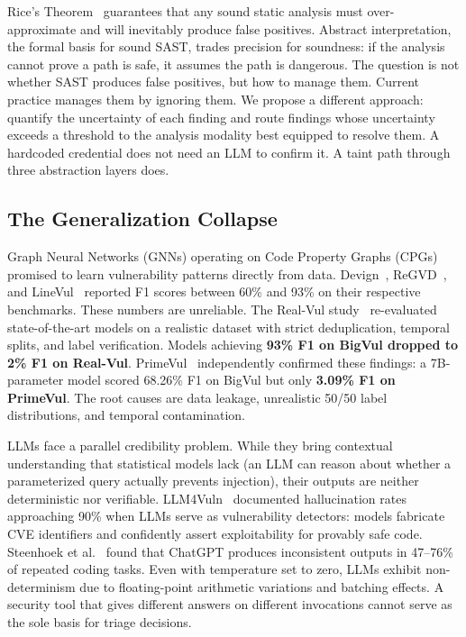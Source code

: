Rice's Theorem~\cite{rice1953} guarantees that any sound static analysis must over-approximate and will inevitably produce false positives. Abstract interpretation, the formal basis for sound SAST, trades precision for soundness: if the analysis cannot prove a path is safe, it assumes the path is dangerous. The question is not whether SAST produces false positives, but how to manage them. Current practice manages them by ignoring them. We propose a different approach: quantify the uncertainty of each finding and route findings whose uncertainty exceeds a threshold to the analysis modality best equipped to resolve them. A hardcoded credential does not need an LLM to confirm it. A taint path through three abstraction layers does.


\subsection{The Generalization Collapse}

Graph Neural Networks (GNNs) operating on Code Property Graphs (CPGs)~\cite{cpg2014} promised to learn vulnerability patterns directly from data. Devign~\cite{devign2019}, ReGVD~\cite{regvd2022}, and LineVul~\cite{linevul2022} reported F1 scores between 60\% and 93\% on their respective benchmarks. These numbers are unreliable. The Real-Vul study~\cite{realvul2024} re-evaluated state-of-the-art models on a realistic dataset with strict deduplication, temporal splits, and label verification. Models achieving \textbf{93\% F1 on BigVul dropped to 2\% F1 on Real-Vul}. PrimeVul~\cite{primevul2024} independently confirmed these findings: a 7B-parameter model scored 68.26\% F1 on BigVul but only \textbf{3.09\% F1 on PrimeVul}. The root causes are data leakage, unrealistic 50/50 label distributions, and temporal contamination.

LLMs face a parallel credibility problem. While they bring contextual understanding that statistical models lack (an LLM can reason about whether a parameterized query actually prevents injection), their outputs are neither deterministic nor verifiable. LLM4Vuln~\cite{llm4vuln2024} documented hallucination rates approaching 90\% when LLMs serve as vulnerability detectors: models fabricate CVE identifiers and confidently assert exploitability for provably safe code. Steenhoek et al.~\cite{steenhoek2024} found that ChatGPT produces inconsistent outputs in 47--76\% of repeated coding tasks. Even with temperature set to zero, LLMs exhibit non-determinism due to floating-point arithmetic variations and batching effects. A security tool that gives different answers on different invocations cannot serve as the sole basis for triage decisions.

